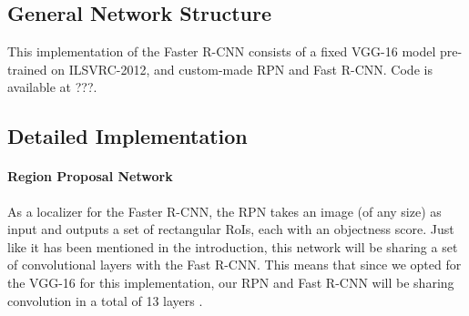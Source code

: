 \documentclass[a4paper]{article}
\begin{document}
\subsection{General Network Structure}
This implementation of the Faster R-CNN consists of a fixed VGG-16 model pre-trained on ILSVRC-2012, and custom-made RPN and Fast R-CNN. Code is available at ???.

\subsection{Detailed Implementation}

\paragraph{Region Proposal Network}
As a localizer for the Faster R-CNN, the RPN takes an image (of any size) as input and outputs a set of rectangular RoIs, each with an objectness score. Just like it has been mentioned in the introduction, this network will be sharing a set of convolutional layers with the Fast R-CNN. This means that since we opted for the VGG-16 for this implementation, our RPN and Fast R-CNN will be sharing convolution in a total of 13 layers \cite{fasterrcnn}.
\end{document}
